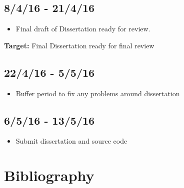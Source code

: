 \documentclass[12pt,a4]{article}
\begin{document}
		\subsection{8/4/16 - 21/4/16}
		\begin{itemize}
			\item Final draft of Dissertation ready for review.
		\end{itemize}
{\bf Target:} Final Dissertation ready for final review
		\subsection{22/4/16 - 5/5/16}
		\begin{itemize}
			\item Buffer period to fix any problems around dissertation
		\end{itemize}
		\subsection{6/5/16 - 13/5/16}
			\begin{itemize}
				\item Submit dissertation and source code
			\end{itemize}
		

	\section{Bibliography}
\end{document}
